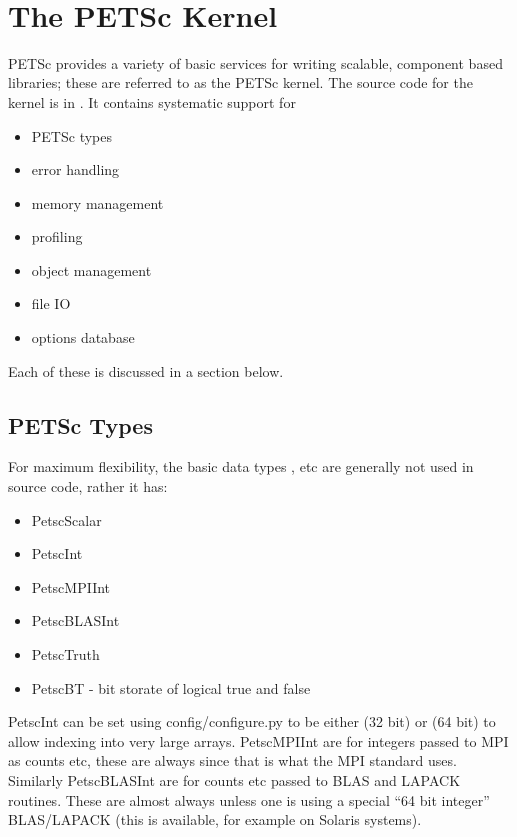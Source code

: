 \documentclass[twoside,12pt]{../sty/report_petsc}
\begin{document}
\newpage
\hbox{ }
\newpage

\chapter{The PETSc Kernel}
\label{chapter:kernel}
PETSc provides a variety of basic services for writing scalable, component 
based libraries; these are referred to as the PETSc kernel. The source
code for the kernel is in . It contains systematic support for
\begin{itemize}
  \item PETSc types
  \item error handling
  \item memory management
  \item profiling
  \item object management
  \item file IO
  \item options database
\end{itemize}
Each of these is discussed in a section below.

\section{PETSc Types}
For maximum flexibility, the basic data types ,  etc are 
generally not used in source code, rather it has:
\begin{itemize}
  \item PetscScalar 
  \item PetscInt
  \item PetscMPIInt
  \item PetscBLASInt
  \item PetscTruth
  \item PetscBT  - bit storate of logical true and false
\end{itemize}
PetscInt can be set using config/configure.py to be either  (32 bit) or 
(64 bit)
to allow indexing into very large arrays. PetscMPIInt are for integers passed to MPI
as counts etc, these are always  since that is what the MPI standard uses. Similarly
PetscBLASInt are for counts etc passed to BLAS and LAPACK routines. These are almost always
 unless one is using a special ``64 bit integer'' BLAS/LAPACK (this is available, for 
example on Solaris systems).
\end{document}

